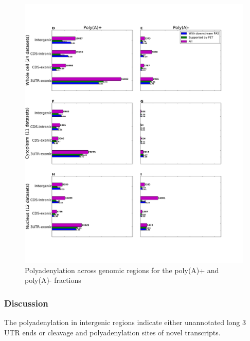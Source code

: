 \begin{figure}[htb]
	\begin{center}
		\includegraphics[scale=0.4]{figures/polyadenylation/Sidebars_pA_2+.pdf}
	\end{center}
	\caption{Polyadenylation across genomic regions for the poly(A)+ and poly(A)-
	fractions}
	\label{fig:sidebars}
\end{figure}

\subsubsection{Discussion}
The polyadenylation in intergenic regions indicate either unannotated long 3\p
UTR ends or cleavage and polyadenylation sites of novel transcripts.
